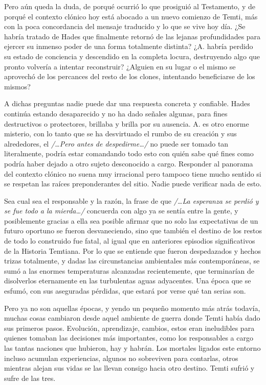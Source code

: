 \documentclass[
]{book}
\begin{document}
Pero aún queda la duda, de porqué ocurrió lo que prosiguió al Testamento, y de porqué el contexto clónico hoy está abocado a un nuevo comienzo de Temti, más con la poca concordancia del mensaje traducido y lo que se vive hoy día. ¿Se habría tratado de Hades que finalmente retornó de las lejanas profundidades para ejercer su inmenso poder de una forma totalmente distinta? ¿A. habría perdido su estado de conciencia y descendido en la completa locura, destruyendo algo que pronto volvería a intentar reconstruir? ¿Alguien en su lugar o el mismo se aprovechó de los percances del resto de los clones, intentando beneficiarse de los mismos?

A dichas preguntas nadie puede dar una respuesta concreta y confiable. Hades continúa estando desaparecido y no ha dado señales algunas, para fines destructivos o protectores, brillaba y brilla por su ausencia. A. es otro enorme misterio, con lo tanto que se ha desvirtuado el rumbo de su creación y sus alrededores, el \emph{/\ldots Pero antes de despedirme\ldots/} no puede ser tomado tan literalmente, podría estar comandando todo esto con quién sabe qué fines como podría haber dejado a otro sujeto desconocido a cargo. Responder al panorama del contexto clónico no suena muy irracional pero tampoco tiene mucho sentido si se respetan las raíces preponderantes del sitio. Nadie puede verificar nada de esto.

Sea cual sea el responsable y la razón, la frase de que \emph{/\ldots La esperanza se perdió y se fue todo a la mierda\ldots/} concuerda con algo ya se sentía entre la gente, y posiblemente gracias a ella sea posible afirmar que no solo las expectativas de un futuro oportuno se fueron desvaneciendo, sino que también el destino de los restos de todo lo construido fue fatal, al igual que en anteriores episodios significativos de la Historia Temtiana. Por lo que se entiende que fueron despedazados y hechos trizas totalmente, y dadas las circunstancias ambientales más contemporáneas, se sumó a las enormes temperaturas alcanzadas recientemente, que terminarían de disolverlos eternamente en las turbulentas aguas adyacentes. Una época que se esfumó, con sus aseguradas pérdidas, que estará por verse qué tan serias son.

Pero ya no son aquellas épocas, y yendo un pequeño momento más atrás todavía, muchas cosas cambiaron desde aquel ambiente de guerra donde Temti había dado sus primeros pasos. Evolución, aprendizaje, cambios, estos eran ineludibles para quienes tomaban las decisiones más importantes, como los responsables a cargo las tantas naciones que hubieron, hay y habrán. Los mortales ligados este entorno incluso acumulan experiencias, algunos no sobreviven para contarlas, otros mientras alejan sus vidas se las llevan consigo hacia otro destino. Temti sufrió y sufre de las tres.
\end{document}
